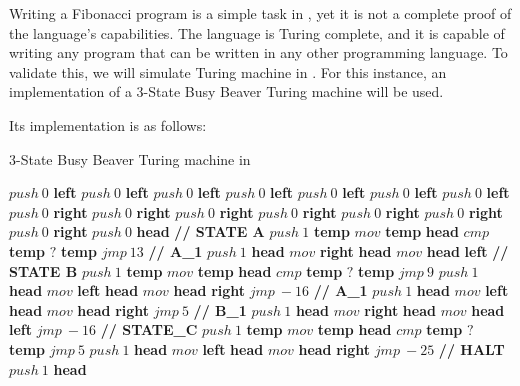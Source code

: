Writing a Fibonacci program is a simple task in \sculpt, yet it is not a complete proof of the language's capabilities.
The language is Turing complete, and it is capable of writing any program that can be written in any other programming language.
To validate this, we will simulate Turing machine in \sculpt.
For this instance, an implementation of a 3-State Busy Beaver Turing machine will be used.

Its \sculpter implementation is as follows:

\begin{algorithm}
    \caption{3-State Busy Beaver Turing machine in \sculpt}
    \label{alg:busybeaver}
    \begin{algorithmic}
    \State $push~0$ \textbf{left}
    \State $push~0$ \textbf{left}
    \State $push~0$ \textbf{left}
    \State $push~0$ \textbf{left}
    \State $push~0$ \textbf{left}
    \State $push~0$ \textbf{left}
    \State $push~0$ \textbf{left}
    \State
    \State $push~0$ \textbf{right}
    \State $push~0$ \textbf{right}
    \State $push~0$ \textbf{right}
    \State $push~0$ \textbf{right}
    \State $push~0$ \textbf{right}
    \State $push~0$ \textbf{right}
    \State $push~0$ \textbf{right}
    \State
    \State $push~0$ \textbf{head}
    \State
    \State \textbf{// STATE A}
    \State $push~1$ \textbf{temp}
    \State $mov$ \textbf{temp} \textbf{head}
    \State $cmp$ \textbf{temp}
    \State $?$ \textbf{temp}
    \State $jmp~13$ \textbf{// A\_1}
    \State $push~1$ \textbf{head}
    \State $mov$ \textbf{right} \textbf{head}
    \State $mov$ \textbf{head} \textbf{left}
    \State
    \State \textbf{// STATE B}
    \State $push~1$ \textbf{temp}
    \State $mov$ \textbf{temp} \textbf{head}
    \State $cmp$ \textbf{temp}
    \State $?$ \textbf{temp}
    \State $jmp~9$
    \State $push~1$ \textbf{head}
    \State $mov$ \textbf{left} \textbf{head}
    \State $mov$ \textbf{head} \textbf{right}
    \State $jmp~-16$
    \State
    \State \textbf{// A\_1}
    \State $push~1$ \textbf{head}
    \State $mov$ \textbf{left} \textbf{head}
    \State $mov$ \textbf{head} \textbf{right}
    \State $jmp~5$
    \State
    \State \textbf{// B\_1}
    \State $push~1$ \textbf{head}
    \State $mov$ \textbf{right} \textbf{head}
    \State $mov$ \textbf{head} \textbf{left}
    \State $jmp~-16$
    \State
    \State \textbf{// STATE\_C}
    \State $push~1$ \textbf{temp}
    \State $mov$ \textbf{temp} \textbf{head}
    \State $cmp$ \textbf{temp}
    \State $?$ \textbf{temp}
    \State $jmp~5$
    \State $push~1$ \textbf{head}
    \State $mov$ \textbf{left} \textbf{head}
    \State $mov$ \textbf{head} \textbf{right}
    \State $jmp~-25$
    \State
    \State \textbf{// HALT}
    \State $push~1$ \textbf{head}
    \end{algorithmic}
\end{algorithm}

